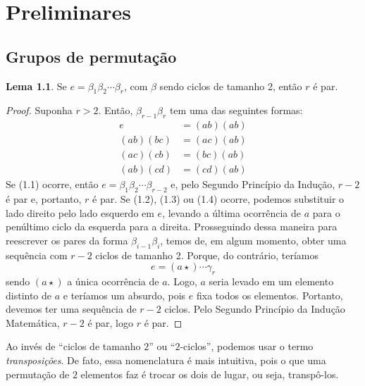 \documentclass[a4paper,portuguese,11pt,twoside, leqno]{book}
\theoremstyle{definition}
\newtheorem{lemma}[theorem]{Lema}
\begin{document}
	\setlength{\baselineskip}{7mm} 
	
	\part{Preliminares}
	
	
	\chapter{Grupos de permutação}\label{capitulo grupos de permutacao}
	\begin{lemma}
		\label{lema identidade permutacoes}
		\hspace{12pt} Se $e = \beta_{1}\beta_{2}\cdots\beta_{r}$, com $\beta$ sendo ciclos de tamanho 2, então $r$ é par.
	\end{lemma}
	\begin{proof}
		\vspace{0.3cm}\par Suponha $r>2$. Então, $\beta_{r-1}\beta_{r}$ tem uma das seguintes formas:
		\begin{align}
		e &= (ab)(ab) \\
		(ab)(bc) &= (ac)(ab) \\
		(ac)(cb) &= (bc)(ab) \\
		(ab)(cd) &= (cd)(ab) 
		\end{align}
		Se (1.1) ocorre, então $e = \beta_{1}\beta_{2}\cdots\beta_{r-2}$ e, pelo Segundo Princípio da Indução, $r-2$ é par e, portanto, $r$ é par. Se (1.2), (1.3) ou (1.4) ocorre, podemos substituir o lado direito pelo lado esquerdo em $e$, levando a última ocorrência de $a$ para o penúltimo ciclo da esquerda para a direita. Prosseguindo dessa maneira para reescrever os pares da forma $\beta_{i-1}\beta_{i}$, temos de, em algum momento, obter uma sequência com $r-2$ ciclos de tamanho 2. Porque, do contrário, teríamos
		\begin{equation*}
		e = (a \star)\cdots\gamma_{r}
		\end{equation*}   
		sendo $(a\star)$ a única ocorrência de $a$. Logo, $a$ seria levado em um elemento distinto de $a$ e teríamos um absurdo, pois $e$ fixa todos os  elementos. Portanto, devemos ter uma sequência de $r-2$ ciclos. Pelo Segundo Princípio da Indução Matemática, $r-2$ é par, logo $r$ é par.
	\end{proof}
	\par\vspace{0.3cm} Ao invés de ``ciclos de tamanho $2$'' ou ``$2$-ciclos'', podemos usar o termo \textit{transposições}. De fato, essa nomenclatura é mais intuitiva, pois o que uma permutação de $2$ elementos faz é trocar os dois de lugar, ou seja, transpô-los.
\end{document}
